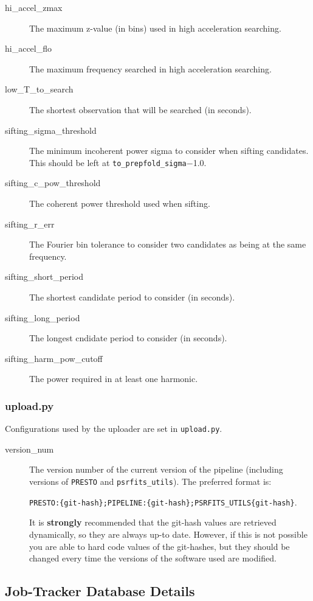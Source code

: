 \begin{description}
    \item[hi\_accel\_zmax] The maximum z-value (in bins) used in high acceleration searching.
    \item[hi\_accel\_flo] The maximum frequency searched in high acceleration searching.
    \item[low\_T\_to\_search] The shortest observation that will be searched (in seconds).
    \item[sifting\_sigma\_threshold] The minimum incoherent power sigma to consider when sifting candidates. This should be left at \texttt{to\_prepfold\_sigma}$-$1.0.
    \item[sifting\_c\_pow\_threshold] The coherent power threshold used when sifting.
    \item[sifting\_r\_err] The Fourier bin tolerance to consider two candidates as being at the same frequency.
    \item[sifting\_short\_period] The shortest candidate period to consider (in seconds).
    \item[sifting\_long\_period] The longest cndidate period to consider (in seconds).
    \item[sifting\_harm\_pow\_cutoff] The power required in at least one harmonic.
\end{description}
    

\subsubsection{upload.py}
Configurations used by the uploader are set in \texttt{upload.py}.

\begin{description}
    \item[version\_num] The version number of the current version of the pipeline (including versions of \texttt{PRESTO} and \texttt{psrfits\_utils}). The preferred format is:
    
    \texttt{PRESTO:\{git-hash\};PIPELINE:\{git-hash\};PSRFITS\_UTILS\{git-hash\}}. 
    
    It is \textbf{strongly} recommended that the git-hash values are retrieved dynamically, so they are always up-to date. However, if this is not possible you are able to hard code values of the git-hashes, but they should be changed every time the versions of the software used are modified.
\end{description}


\subsection{Job-Tracker Database Details}
\label{sec:dbdetails}

